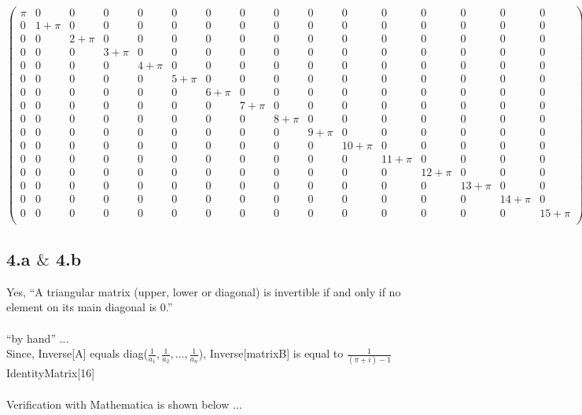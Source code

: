 \documentclass[11pt,a4paper]{article}
\begin{document}
\begin{doublespace}
\noindent\(\left(
\begin{array}{cccccccccccccccc}
 \pi  & 0 & 0 & 0 & 0 & 0 & 0 & 0 & 0 & 0 & 0 & 0 & 0 & 0 & 0 & 0 \\
 0 & 1+\pi  & 0 & 0 & 0 & 0 & 0 & 0 & 0 & 0 & 0 & 0 & 0 & 0 & 0 & 0 \\
 0 & 0 & 2+\pi  & 0 & 0 & 0 & 0 & 0 & 0 & 0 & 0 & 0 & 0 & 0 & 0 & 0 \\
 0 & 0 & 0 & 3+\pi  & 0 & 0 & 0 & 0 & 0 & 0 & 0 & 0 & 0 & 0 & 0 & 0 \\
 0 & 0 & 0 & 0 & 4+\pi  & 0 & 0 & 0 & 0 & 0 & 0 & 0 & 0 & 0 & 0 & 0 \\
 0 & 0 & 0 & 0 & 0 & 5+\pi  & 0 & 0 & 0 & 0 & 0 & 0 & 0 & 0 & 0 & 0 \\
 0 & 0 & 0 & 0 & 0 & 0 & 6+\pi  & 0 & 0 & 0 & 0 & 0 & 0 & 0 & 0 & 0 \\
 0 & 0 & 0 & 0 & 0 & 0 & 0 & 7+\pi  & 0 & 0 & 0 & 0 & 0 & 0 & 0 & 0 \\
 0 & 0 & 0 & 0 & 0 & 0 & 0 & 0 & 8+\pi  & 0 & 0 & 0 & 0 & 0 & 0 & 0 \\
 0 & 0 & 0 & 0 & 0 & 0 & 0 & 0 & 0 & 9+\pi  & 0 & 0 & 0 & 0 & 0 & 0 \\
 0 & 0 & 0 & 0 & 0 & 0 & 0 & 0 & 0 & 0 & 10+\pi  & 0 & 0 & 0 & 0 & 0 \\
 0 & 0 & 0 & 0 & 0 & 0 & 0 & 0 & 0 & 0 & 0 & 11+\pi  & 0 & 0 & 0 & 0 \\
 0 & 0 & 0 & 0 & 0 & 0 & 0 & 0 & 0 & 0 & 0 & 0 & 12+\pi  & 0 & 0 & 0 \\
 0 & 0 & 0 & 0 & 0 & 0 & 0 & 0 & 0 & 0 & 0 & 0 & 0 & 13+\pi  & 0 & 0 \\
 0 & 0 & 0 & 0 & 0 & 0 & 0 & 0 & 0 & 0 & 0 & 0 & 0 & 0 & 14+\pi  & 0 \\
 0 & 0 & 0 & 0 & 0 & 0 & 0 & 0 & 0 & 0 & 0 & 0 & 0 & 0 & 0 & 15+\pi  \\
\end{array}
\right)\)
\end{doublespace}

\clearpage

\subsection*{4.a $\&$ 4.b}

Yes, {``}A triangular matrix (upper, lower or diagonal) is invertible if and only if no element on its main diagonal is 0.{''}\\
\\
{``}by hand{''} ...\\
Since, Inverse[A] equals diag($\frac{1}{a_1},\frac{1}{a_2},\ldots ,\frac{1}{a_n}$), Inverse[matrixB] is equal to $\frac{1}{(\pi +i)-1}$IdentityMatrix[16]\\
\\
Verification with Mathematica is shown below ...
\end{document}
